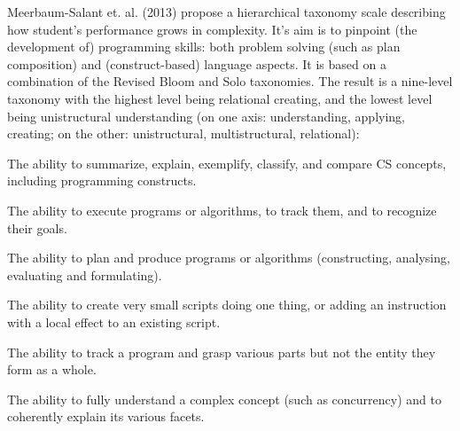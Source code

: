 Meerbaum-Salant et. al. (2013) propose a hierarchical taxonomy scale describing how student’s performance grows in complexity. It’s aim is to pinpoint (the development of) programming skills: both problem solving (such as plan composition) and (construct-based) language aspects. It is based on a combination of the Revised Bloom and Solo taxonomies. The result is a nine-level taxonomy with
the highest level being relational creating, and the lowest level being
unistructural understanding (on one axis: understanding, applying, creating; on the other: unistructural, multistructural, relational):



\begin{description}[leftmargin=1em]
\item[Understanding:] The ability to summarize, explain, exemplify,
    classify, and compare CS concepts, including programming constructs.
\item[Applying:] The ability to execute programs or algorithms, to track
    them, and to recognize their goals.
\item[Creating:] The ability to plan and produce programs or algorithms
    (constructing, analysing, evaluating and formulating).
\item[Unistructural:] The ability to create very small scripts doing one
    thing, or adding an instruction with a local effect to an existing
    script.
\item[Multistructural:] The ability to track a program and grasp various
    parts but not the entity they form as a whole.
\item[Relational:] The ability to fully understand a complex concept (such
    as concurrency) and to coherently explain its various facets.
\end{description}






